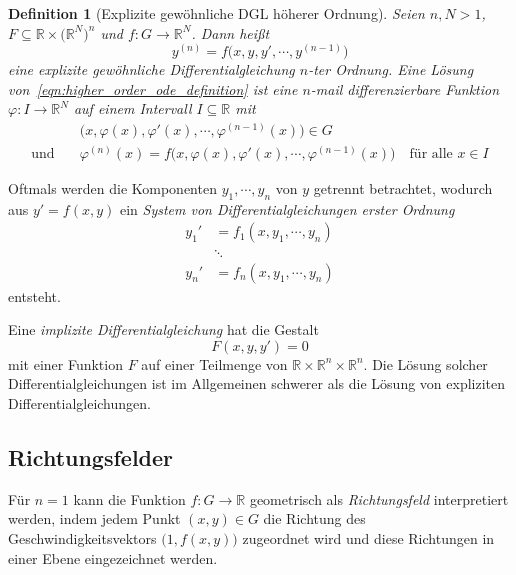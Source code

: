 \documentclass[a4paper, 11pt, accentcolor = tud3b]{tudreport}
\newtheorem{definition}[theorem]{Definition}
\newcommand{\R}{\mathbb{R}}
\begin{document}
				\begin{definition}[Explizite gewöhnliche DGL höherer Ordnung]
					Seien \( n, N > 1 \), \( F \subseteq \R \times \big(\R^N\big)^n \) und \( f : G \to \R^N \). Dann heißt
					\begin{equation}
						y^{(n)} = f\big(x, y, y', \cdots, y^{(n - 1)}\big)  \label{eqn:higher_order_ode_definition}
					\end{equation}
					eine \emph{explizite gewöhnliche Differentialgleichung \(n\)-ter Ordnung}. Eine \emph{Lösung} von~\ref{eqn:higher_order_ode_definition} ist eine \(n\)-mail differenzierbare Funktion \( \varphi : I \to \R^N \) auf einem Intervall \( I \subseteq \R \) mit
					\begin{align*}
						                & \big(x, \varphi(x), \varphi'(x), \cdots, \varphi^{(n - 1)}(x)\big) \in G                                         \\
						\text{und}\quad & \varphi^{(n)}(x) = f\big(x, \varphi(x), \varphi'(x), \cdots, \varphi^{(n - 1)}(x)\big) \quad\text{für alle } x \in I
					\end{align*}
				\end{definition}
			
				Oftmals werden die Komponenten \( y_1, \cdots, y_n \) von \(y\) getrennt betrachtet, wodurch aus \( y' = f(x, y) \) ein \emph{System von Differentialgleichungen erster Ordnung}
				\begin{align*}
					y_1' &= f_1(x, y_1, \cdots, y_n) \\
					& \ddots \\
					y_n' &= f_n(x, y_1, \cdots, y_n)
				\end{align*}
				entsteht.
				
				Eine \emph{implizite Differentialgleichung} hat die Gestalt
				\begin{equation*}
					F(x, y, y') = 0
				\end{equation*}
				mit einer Funktion \( F \) auf einer Teilmenge von \( \R \times \R^n \times \R^n \). Die Lösung solcher Differentialgleichungen ist im Allgemeinen schwerer als die Lösung von expliziten Differentialgleichungen.

			\subsection{Richtungsfelder}
				Für \( n = 1 \) kann die Funktion \( f : G \to \R \) geometrisch als \emph{Richtungsfeld} interpretiert werden, indem jedem Punkt \( (x, y) \in G \) die Richtung des Geschwindigkeitsvektors \( \big(1, f(x, y)\big) \) zugeordnet wird und diese Richtungen in einer Ebene eingezeichnet werden.
				
\end{document}
